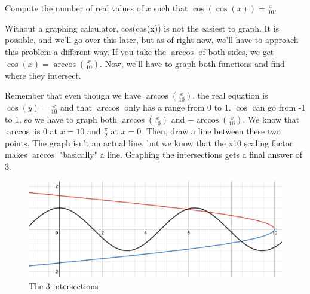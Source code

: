 \documentclass{article}
\begin{document}
\vspace{5mm}
\begin{example}
\begin{problem}[ARML 2021 T-4]
Compute the number of real values of $x$ such that $\cos(\cos(x))=\frac x{10}$.
\end{problem}

\vspace{5mm}
\noindent Without a graphing calculator, cos(cos(x)) is not the easiest to graph. It is possible, and we'll go over this later, but as of right now, we'll have to approach this problem a different way. If you take the $\arccos$ of both sides, we get $\cos(x) = \arccos(\frac{x}{10})$. Now, we'll have to graph both functions and find where they intersect.

\vspace{5mm}
\noindent Remember that even though we have $\arccos(\frac{x}{10})$, the real equation is $\cos(y)=\frac{x}{10}$ and that $\arccos$ only has a range from 0 to 1. $\cos$ can go from -1 to 1, so we have to graph both $\arccos(\frac{x}{10})$ and $-\arccos(\frac{x}{10})$. We know that $\arccos$ is 0 at $x=10$ and $\frac{\pi}{2}$ at $x=0$. Then, draw a line between these two points. The graph isn't an actual line, but we know that the x10 scaling factor makes $\arccos$ "basically" a line. Graphing the intersections gets a final answer of $\boxed{3}$.

\begin{figure}[H]
    \centering
    \includegraphics[width=12cm]{Intersections2.png}
    \caption{The 3 intersections}
    \label{fig:my_label}
\end{figure}

\end{example}

\end{document}
